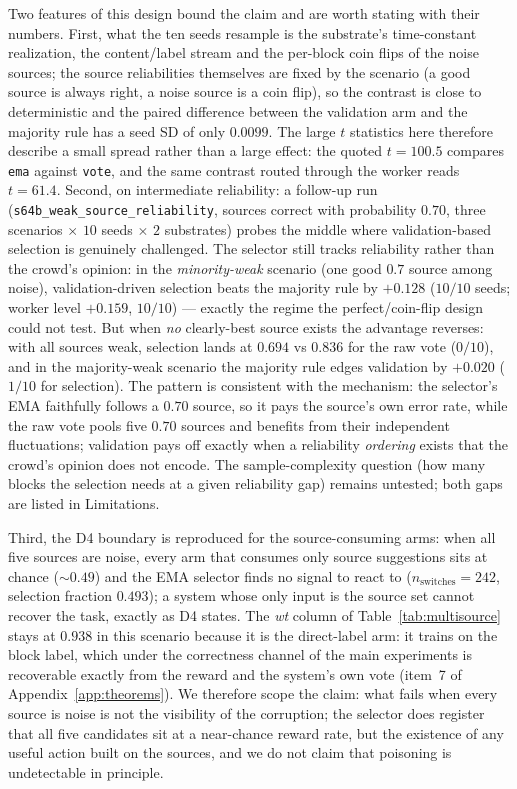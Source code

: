 \documentclass[preprint,12pt]{elsarticle}
\begin{document}
Two features of this design bound the claim and are worth
stating with their numbers. First, what the ten seeds resample is the
substrate's time-constant realization, the content/label stream and the
per-block coin flips of the noise sources; the source reliabilities themselves
are fixed by the scenario (a good source is always right, a noise source is a
coin flip), so the contrast is close to deterministic and the paired
difference between the validation arm and the majority rule has a seed SD of
only $0.0099$. The large $t$ statistics here therefore describe a small spread
rather than a large effect: the quoted $t=100.5$ compares \texttt{ema} against
\texttt{vote}, and the same contrast routed through the worker reads $t=61.4$.
Second, on intermediate reliability: a follow-up run
(\texttt{s64b\_weak\_source\_reliability}, sources correct with
probability $0.70$, three scenarios $\times$ $10$ seeds $\times$ $2$
substrates) probes the middle where validation-based selection is
genuinely challenged. The selector still tracks reliability rather
than the crowd's opinion: in the \emph{minority-weak} scenario
(one good $0.7$ source among noise), validation-driven selection beats
the majority rule by $+0.128$ ($10/10$ seeds; worker level $+0.159$,
$10/10$) --- exactly the regime the perfect/coin-flip design could not
test. But when \emph{no} clearly-best source exists the advantage
reverses: with all sources weak, selection lands at $0.694$ vs $0.836$
for the raw vote ($0/10$), and in the majority-weak scenario the
majority rule edges validation by $+0.020$ ($1/10$ for selection).
The pattern is consistent with the mechanism: the selector's EMA
faithfully follows a $0.70$ source, so it pays the source's own error
rate, while the raw vote pools five $0.70$ sources and benefits from
their independent fluctuations; validation pays off exactly when a
reliability \emph{ordering} exists that the crowd's opinion does not
encode. The sample-complexity question (how many blocks the selection
needs at a given reliability gap) remains untested; both gaps are
listed in Limitations.

Third, the D4 boundary is reproduced for the source-consuming arms: when all
five sources are noise, every arm that consumes only source suggestions sits
at chance ($\sim0.49$) and the EMA selector finds no signal to react to
($n_{\mathrm{switches}}=242$, selection fraction $0.493$); a system whose
only input is the source set cannot recover the task, exactly as D4 states.
The \textit{wt} column of Table~\ref{tab:multisource} stays at $0.938$ in
this scenario because it is the direct-label arm: it trains on the block
label, which under the correctness channel of the main experiments is
recoverable exactly from the reward and the system's own vote (item~7 of
Appendix~\ref{app:theorems}). We therefore scope the claim: what fails when
every source is noise is not the visibility of the corruption; the
selector does register that all five candidates sit at a near-chance reward
rate, but the existence of any useful action built on the sources, and we
do not claim that poisoning is undetectable in principle.
\end{document}

